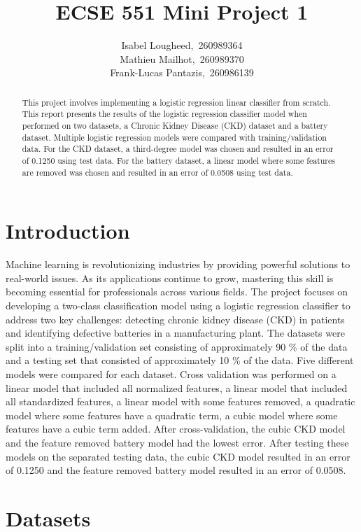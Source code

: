 \documentclass{article}
\title{ECSE 551 Mini Project 1}
\author{
  Isabel Lougheed,~260989364 \\
  \And
  Mathieu Mailhot,~260989370 \\
  \And
  Frank-Lucas Pantazis,~260986139 \\
}
\begin{document}
\maketitle

\begin{abstract}
  This project involves implementing a logistic regression linear classifier from scratch.  This report presents the results of the logistic regression classifier model when performed on two datasets, a Chronic Kidney Disease (CKD) dataset and a battery dataset.  Multiple logistic regression models were compared with training/validation data.  For the CKD dataset, a third-degree model was chosen and resulted in an error of 0.1250 using test data. For the battery dataset, a linear model where some features are removed was chosen and resulted in an error of 0.0508 using test data. 
\end{abstract}

\section{Introduction}

Machine learning is revolutionizing industries by providing powerful solutions to real-world issues. As its applications continue to grow, mastering this skill is becoming essential for professionals across various fields. The project focuses on developing a two-class classification model using a logistic regression classifier to address two key challenges: detecting chronic kidney disease (CKD) in patients and identifying defective batteries in a manufacturing plant. 
The datasets were split into a training/validation set consisting of approximately 90 \% of the data and a testing set that consisted of approximately 10 \% of the data.  Five different models were compared for each dataset.  Cross validation was performed on a linear model that included all normalized features, a linear model that included all standardized features, a linear model with some features removed, a quadratic model where some features have a quadratic term, a cubic model where some features have a cubic term added.  After cross-validation, the cubic CKD model and the feature removed battery model had the lowest error.  After testing these models on the separated testing data, the cubic CKD model resulted in an error of 0.1250 and the feature removed battery model resulted in an error of 0.0508. 

\section{Datasets}
\end{document}
